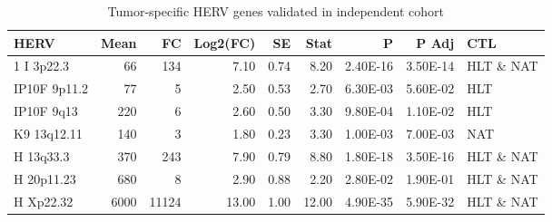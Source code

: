 \begin{table}[ht]
\centering
\caption{Tumor-specific HERV genes validated in independent cohort} 
\label{tab_val}
\begingroup\small
\begin{tabular}{lrrrrrrrl}
 {\textbf{HERV}} & {\textbf{Mean}} & {\textbf{FC}} & {\textbf{Log2(FC)}} & {\textbf{SE}} & {\textbf{Stat}} & {\textbf{P}} & {\textbf{P Adj}} & {\textbf{CTL}} \\ 
  \hline
1 I 3p22.3 & 66 & 134 & 7.10 & 0.74 & 8.20 & 2.40E-16 & 3.50E-14 & HLT \& NAT \\ 
  IP10F 9p11.2 & 77 & 5 & 2.50 & 0.53 & 2.70 & 6.30E-03 & 5.60E-02 & HLT \\ 
  IP10F 9q13 & 220 & 6 & 2.60 & 0.50 & 3.30 & 9.80E-04 & 1.10E-02 & HLT \\ 
  K9 13q12.11 & 140 & 3 & 1.80 & 0.23 & 3.30 & 1.00E-03 & 7.00E-03 & NAT \\ 
  H 13q33.3 & 370 & 243 & 7.90 & 0.79 & 8.80 & 1.80E-18 & 3.50E-16 & HLT \& NAT \\ 
  H 20p11.23 & 680 & 8 & 2.90 & 0.88 & 2.20 & 2.80E-02 & 1.90E-01 & HLT \& NAT \\ 
  H Xp22.32 & 6000 & 11124 & 13.00 & 1.00 & 12.00 & 4.90E-35 & 5.90E-32 & HLT \& NAT \\ 
   \hline
\end{tabular}
\endgroup
\end{table}
